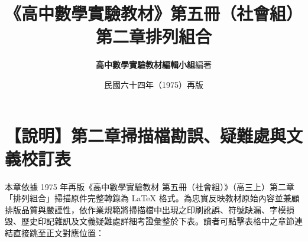 \documentclass[a4paper,12pt,twoside]{article}
\title{\LARGE\textbf{《高中數學實驗教材》第五冊（社會組）}\\[0.5em] \Large\textbf{第二章\quad 排列組合}}
\author{\textbf{高中數學實驗教材編輯小組}\quad 編著}
\date{民國六十四年（1975）再版}
\begin{document}
\maketitle
\thispagestyle{firstpage}

\section*{【說明】第二章掃描檔勘誤、疑難處與文義校訂表}
\label{sec:errata_notes_b5_ch2}
\label{sec:current_errata}

本章依據 1975 年再版《高中數學實驗教材 第五冊（社會組）》（高三上）第二章「排列組合」掃描原件完整轉錄為 \LaTeX{} 格式。為忠實反映教材原始內容並兼顧排版品質與嚴謹性，依作業規範將掃描檔中出現之印刷訛誤、符號缺漏、字模損毀、歷史印記雜訊及文義疑難處詳細考證彙整於下表。讀者可點擊表格中之章節連結直接跳至正文對應位置：
\end{document}
